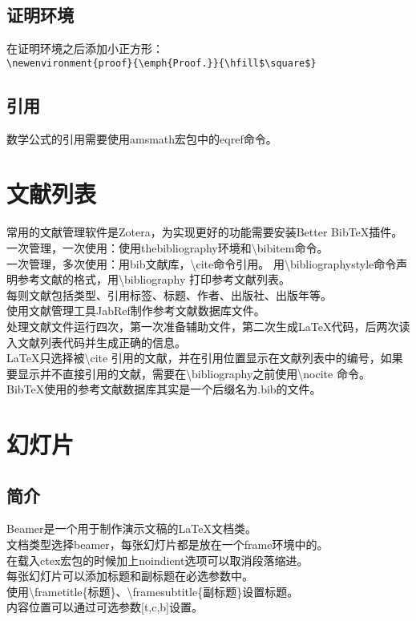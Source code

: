 \documentclass{book}%
\begin{document}
    \section{证明环境}
    在证明环境之后添加小正方形：\\
    \verb|\newenvironment{proof}{\emph{Proof.}}{\hfill$\square$}|\\
    
    \section{引用}
    数学公式的引用需要使用amsmath宏包中的eqref命令。\\
    
    \chapter{文献列表}
    常用的文献管理软件是Zotera，为实现更好的功能需要安装Better BibTeX插件。\\ 
    一次管理，一次使用：使用thebibliography环境和\textbackslash bibitem命令。\\
    一次管理，多次使用：用bib文献库，\textbackslash cite命令引用。
    用\textbackslash bibliographystyle命令声明参考文献的格式，用\textbackslash bibliography 打印参考文献列表。\\
    每则文献包括类型、引用标签、标题、作者、出版社、出版年等。\\
    使用文献管理工具JabRef制作参考文献数据库文件。\\
    \BibTeX 处理文献文件运行四次，第一次准备辅助文件，第二次生成\LaTeX 代码，后两次读入文献列表代码并生成正确的信息。\\
    \LaTeX 只选择被\textbackslash cite 引用的文献，并在引用位置显示在文献列表中的编号，如果要显示并不直接引用的文献，需要在\textbackslash bibliography之前使用\textbackslash nocite 命令。\\
    BibTeX使用的参考文献数据库其实是一个后缀名为.bib的文件。\\
    
    \chapter{幻灯片}
    
    \section{简介}
    Beamer是一个用于制作演示文稿的\LaTeX 文档类。\\
    文档类型选择beamer，每张幻灯片都是放在一个frame环境中的。\\
    在载入ctex宏包的时候加上noindient选项可以取消段落缩进。\\
    每张幻灯片可以添加标题和副标题在必选参数中。\\
    使用\textbackslash frametitle\{标题\}、\textbackslash framesubtitle\{副标题\}设置标题。\\
    内容位置可以通过可选参数[t,c,b]设置。\\
    
\end{document}
